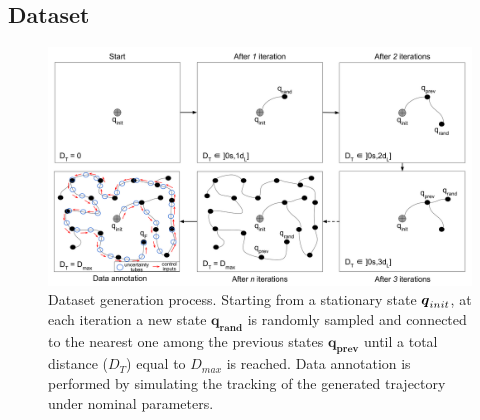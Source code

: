 

\subsection{Dataset}\label{sec:dataset_general}

\begin{figure} [htp]
    \centering
    \includegraphics[width=0.9\linewidth]{figures/learning_quadrotor/dataset_generation.png}%
    \caption{Dataset generation process. 
    Starting from a stationary state $\boldsymbol{q}_{init}$, at each iteration a new state $\boldsymbol{q_{rand}}$ is randomly sampled and connected to the nearest one among the previous states $\boldsymbol{q_{prev}}$ until a total distance ($D_T$) equal to $D_{max}$ is reached.
    Data annotation is performed by simulating the tracking of the generated trajectory under nominal parameters.
    }%
    \label{fig: data_generation}%
\end{figure}


